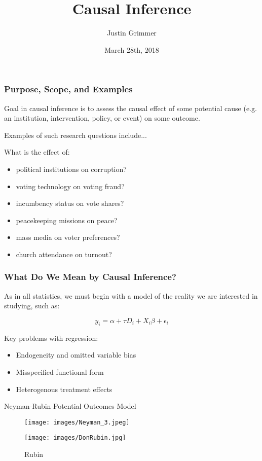 \documentclass{beamer}
\title[Causal Inference] %
{Causal Inference}
\author{Justin Grimmer}
\institute[University of Chicago]{Associate Professor\\Department of Political Science \\  University of Chicago}
\date{March 28th, 2018}
\numberwithin{equation}{section}
\begin{document}
\begin{frame}
\titlepage
\end{frame}


\begin{frame}
  \frametitle{Purpose, Scope, and Examples}
Goal in causal inference is to assess the causal effect of some potential cause (e.g. an institution, intervention, policy, or event) on some outcome.\\\bigskip

Examples of such research questions include... \\\medskip

What is the effect of:
\begin{itemize}
 \item political institutions on corruption?
 \item voting technology on  voting fraud?
 \item incumbency status on vote shares?
 \item peacekeeping missions on peace?
 \item mass media on voter preferences?
 \item church attendance on turnout?
\end{itemize}
\end{frame}

\begin{frame}
  \frametitle{What Do We Mean by Causal Inference?}

As in all statistics, we must begin with a model of the reality we are interested in studying, such as:

\[y_i = \alpha + \tau D_i + X_i\beta + \epsilon_i\] \bigskip

Key problems with regression:\medskip \pause
\pause
\begin{itemize}
\item Endogeneity and omitted variable bias\medskip
\item Misspecified functional form \medskip
\item Heterogenous treatment effects \medskip
\end{itemize}

\end{frame}

\begin{frame}{Neyman-Rubin Potential Outcomes Model}

\begin{figure}
\centering
\begin{minipage}{.5\textwidth}
  \centering
  \texttt{[image: images/Neyman\_3.jpeg]}
  \caption{Neyman}

\end{minipage}%
\begin{minipage}{.5\textwidth}
  \centering
  \texttt{[image: images/DonRubin.jpg]}
  \caption{Rubin}
\end{minipage}
\end{figure}

\end{frame}
\end{document}
